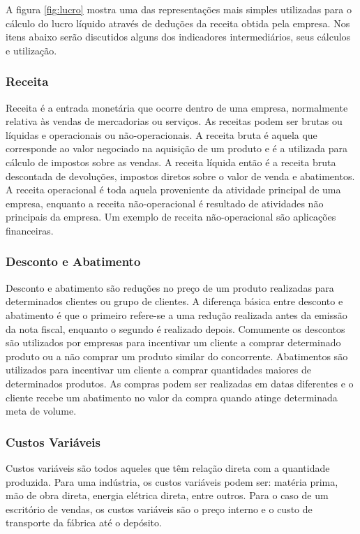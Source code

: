 \documentclass[12pt]{article}
\begin{document}
	A figura \ref{fig:lucro} mostra uma das representações mais simples utilizadas para o cálculo do lucro líquido através de deduções da receita obtida pela empresa. Nos itens abaixo serão discutidos alguns dos indicadores intermediários, seus cálculos e utilização. 

\subsubsection{Receita}

	Receita é a entrada monetária que ocorre dentro de uma empresa, normalmente relativa às vendas de mercadorias ou serviços. As receitas podem ser brutas ou líquidas e operacionais ou não-operacionais. A receita bruta é aquela que corresponde ao valor negociado na aquisição de um produto e é a utilizada para cálculo de impostos sobre as vendas. A receita líquida então é a receita bruta descontada de devoluções, impostos diretos sobre o valor de venda e abatimentos.
A receita operacional é toda aquela proveniente da atividade principal de uma empresa, enquanto a receita não-operacional é resultado de atividades não principais da empresa. Um exemplo de receita não-operacional são aplicações financeiras.

\subsubsection{Desconto e Abatimento}

	Desconto e abatimento são reduções no preço de um produto realizadas para determinados clientes ou grupo de clientes. A diferença básica entre desconto e abatimento é que o primeiro refere-se a uma redução realizada antes da emissão da nota fiscal, enquanto o segundo é realizado depois. Comumente os descontos são utilizados por empresas para incentivar um cliente a comprar determinado produto ou a não comprar um produto similar do concorrente. Abatimentos são utilizados para incentivar um cliente a comprar quantidades maiores de determinados produtos. As compras podem ser realizadas em datas diferentes e o cliente recebe um abatimento no valor da compra quando atinge determinada meta de volume.

\subsubsection{Custos Variáveis}

	Custos variáveis são todos aqueles que têm relação direta com a quantidade produzida. Para uma indústria, os custos variáveis podem ser: matéria prima, mão de obra direta, energia elétrica direta, entre outros. Para o caso de um escritório de vendas, os custos variáveis são o preço interno e o custo de transporte da fábrica até o depósito.
\end{document}
